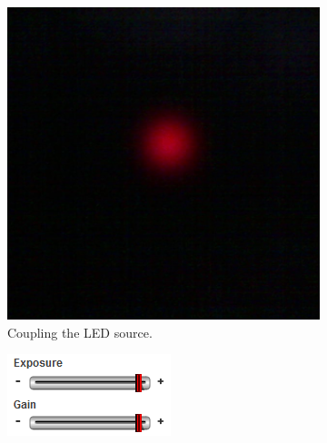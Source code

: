 \documentclass[a4paper, 12pt]{paper}
\begin{document}
\begin{figure}[H]
    \begin{subfigure}[t]{0.3\textwidth}
        \includegraphics[width=\textwidth]{img/LED_spot}
        \caption{Coupling the LED source.}
    \end{subfigure}
    \begin{subfigure}[t]{0.3\textwidth}
        \includegraphics[width=\textwidth]{img/LED}
    \end{subfigure}



\end{figure}
\end{document}
